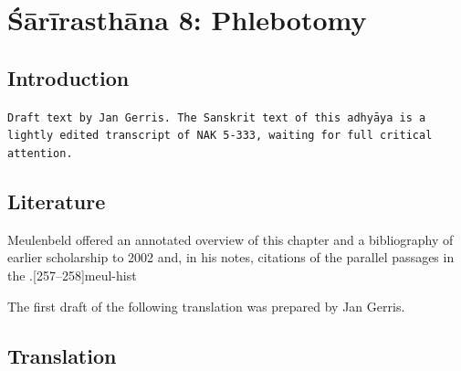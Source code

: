
\chapter{Śārīrasthāna 8:  Phlebotomy}


\section{Introduction}
\texttt{Draft text by Jan Gerris.
    The Sanskrit text of this adhyāya is a lightly 
    edited transcript of NAK 5-333,
    waiting for full critical attention.}

\section{Literature} 

Meulenbeld offered an annotated overview of this chapter and a
bibliography of earlier scholarship to 2002 and, in his notes, citations
of the parallel passages in the \CS.[257--258]{meul-hist}   

The first draft of the following translation was prepared by Jan
Gerris.

\newpage

\section{Translation}


